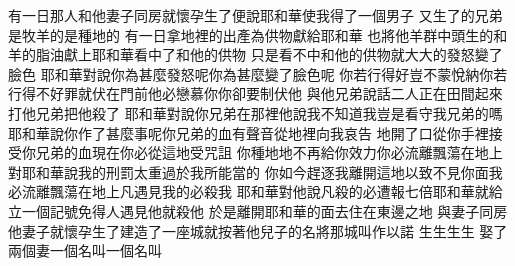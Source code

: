 \bchapter%
有一日\chientien 那人和他妻子同房\chientien{}就懷孕\chientien 生了\chientien{}便說\chientien 耶和華使我得了一個男子\chuan 
{}又生了的兄弟\chuan {}是牧羊的\yuentien {}是種地的\chuan 
{}有一日\chientien{}拿地裡的出產為供物獻給耶和華\yuentien 
{}也將他羊群中頭生的\chientien 和羊的脂油獻上\yuentien 耶和華看中了和他的供物\yuentien 
{}只是看不中和他的供物\yuentien{}就大大的發怒\chientien 變了臉色\chuan 
{}耶和華對說\chientien 你為甚麼發怒呢\chientien 你為甚麼變了臉色呢\yuentien 
{}你若行得好\chientien 豈不蒙悅納\chientien 你若行得不好\chientien 罪就伏在門前\yuentien 他必戀慕你\chientien 你卻要制伏他\chuan 
{}與他兄弟說話\chientien 二人正在田間\chientien{}起來打他兄弟\chientien 把他殺了\chuan\Chuan
{}耶和華對說\chientien 你兄弟在那裡\yuentien 他說\chientien 我不知道\chientien 我豈是看守我兄弟的嗎\chuan 
{}耶和華說\chientien 你作了甚麼事呢\chientien 你兄弟的血\chientien 有聲音從地裡向我哀告\chuan 
{}地開了口\chientien 從你手裡接受你兄弟的血\yuentien 現在你必從這地受咒詛\chuan 
{}你種地\chientien 地不再給你效力\yuentien 你必流離飄蕩在地上\chuan 
{}對耶和華說\chientien 我的刑罰太重\chientien 過於我所能當的\chuan 
{}你如今趕逐我離開這地\chientien 以致不見你面\yuentien 我必流離飄蕩在地上\chientien 凡遇見我的必殺我\chuan 
{}耶和華對他說\chientien 凡殺的必遭報七倍\chuan 耶和華就給立一個記號\chientien 免得人遇見他就殺他\chuan\Chuan
{}於是離開耶和華的面\chientien 去住在東邊之地\chuan 
{}與妻子同房\chientien 他妻子就懷孕\chientien 生了\chientien{}建造了一座城\chientien 就按著他兒子的名將那城叫作以諾\chuan 
{}生\chientien{}生\chientien{}生\chientien {}生\chuan 
{}娶了兩個妻\chientien 一個名叫\hss\linebreak{}\chientien 一個名叫\chuan 
